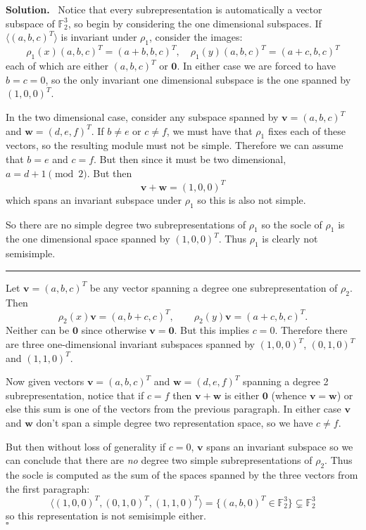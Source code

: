 \documentclass[12pt]{article}
\newcommand*{\F}{
\mathbb{F}
}
\newcommand*{\brk}{
\rule{2in}{.1pt}
}
\newenvironment{sol}{\noindent \textbf{Solution.} \,}{\\\hspace*{\fill}$\square$\medskip}
\begin{document}
\begin{sol}
	Notice that every subrepresentation is automatically a vector subspace of $\F_2^3$, so begin by considering the one dimensional subspaces. If $\langle (a,b,c)^T\rangle$ is invariant under $\rho_1$, consider the images:
	\[\rho_1(x)(a,b,c)^T=(a+b,b,c)^T,\quad\rho_1(y)(a,b,c)^T=(a+c,b,c)^T\]
	each of which are either $(a,b,c)^T$ or $\mathbf{0}$. In either case we are forced to have $b=c=0$, so the only invariant one dimensional subspace is the one spanned by $(1,0,0)^T$.
	
	In the two dimensional case, consider any subspace spanned by $\mathbf{v}=(a,b,c)^T$ and $\mathbf{w}=(d,e,f)^T$. If $b\ne e$ or $c\ne f$, we must have that $\rho_1$ fixes each of these vectors, so the resulting module must not be simple. Therefore we can assume that $b=e$ and $c=f.$ But then since it must be two dimensional, $a=d+1\pmod{2}$. But then
	\[\mathbf{v}+\mathbf{w}=(1,0,0)^T\]
	which spans an invariant subspace under $\rho_1$ so this is also not simple.
	
	So there are no simple degree two subrepresentations of $\rho_1$ so the socle of $\rho_1$ is the one dimensional space spanned by $(1,0,0)^T$. Thus $\rho_1$ is clearly not semisimple.
	
	\brk
	
	Let $\mathbf{v}=(a,b,c)^T$ be any vector spanning a degree one subrepresentation of $\rho_2$. Then 
	\[\rho_2(x)\mathbf{v}=(a,b+c,c)^T,\qquad \rho_2(y)\mathbf{v}=(a+c,b,c)^T.\]
	Neither can be $\mathbf{0}$ since otherwise $\mathbf{v}=\mathbf{0}$. But this implies $c=0$. Therefore there are three one-dimensional invariant subspaces spanned by $(1,0,0)^T$, $(0,1,0)^T$ and $(1,1,0)^T$.
	
	Now given vectors $\mathbf{v}=(a,b,c)^T$ and $\mathbf{w}=(d,e,f)^T$ spanning a degree 2 subrepresentation, notice that if $c=f$ then $\mathbf{v}+\mathbf{w}$ is either $\mathbf{0}$ (whence $\mathbf{v}=\mathbf{w}$) or else this sum is one of the vectors from the previous paragraph. In either case $\mathbf{v}$ and $\mathbf{w}$ don't span a simple degree two representation space, so we have $c\ne f.$
	
	But then without loss of generality if $c=0$, $\mathbf{v}$ spans an invariant subspace so we can conclude that there are \textit{no} degree two simple subrepresentations of $\rho_2$. Thus the socle is computed as the sum of the spaces spanned by the three vectors from the first paragraph:
	\[\langle(1,0,0)^T,(0,1,0)^T,(1,1,0)^T\rangle=\{(a,b,0)^T\in\F_2^3\}\subsetneq\F_2^3\]
	so this representation is not semisimple either.
\end{sol}
\end{document}
